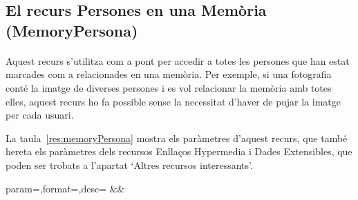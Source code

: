 \subsection{El recurs Persones en una Memòria (MemoryPersona)}

    \paragraph{}
    Aquest recurs s'utilitza com a pont per accedir a totes les persones que han estat marcades com a relacionades en una memòria. Per exemple, si una fotografia conté la imatge de diverses persones i es vol relacionar la memòria amb totes elles, aquest recurs ho fa possible sense la necessitat d'haver de pujar la imatge per cada usuari.

    La taula~\ref{res:memoryPersona} mostra els paràmetres d'aquest recurs, que també hereta els paràmetres dels recursos Enllaços Hypermedia i Dades Extensibles, que poden ser trobats a l'apartat `Altres recursos interessants'.

    \begin{center}
             {param=\param,format=\format,desc=\desc}
             {\param&\format&\desc}
     \end{center}
